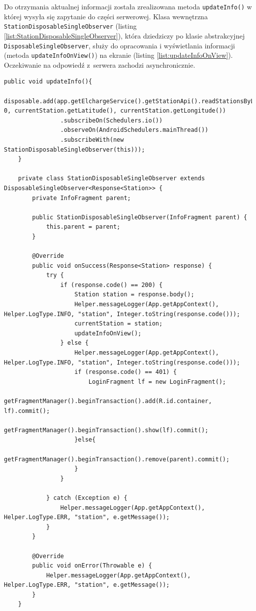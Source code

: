 Do otrzymania aktualnej informacji została zrealizowana metoda \texttt{updateInfo()} w której wysyła się zapytanie do części serwerowej.
Klasa wewnętrzna \texttt{StationDisposableSingleObserver} (listing \ref{list:StationDisposableSingleObserver}), która dziedziczy po klasie abstrakcyjnej \texttt{DisposableSingleObserver}, służy do opracowania i wyświetlania informacji (metoda \texttt{updateInfoOnView()}) na ekranie (listing \ref{list:updateInfoOnView}).
Oczekiwanie na odpowiedź z~serwera zachodzi asynchronicznie.
\begin{lstlisting}[label=list:StationDisposableSingleObserver,caption=Wczytanie danych stacji z części serwerowej,basicstyle=\tiny\ttfamily]
    public void updateInfo(){
        disposable.add(app.getElchargeService().getStationApi().readStationsByLatAndLng(0, 0, currentStation.getLatitude(), currentStation.getLongitude())
                .subscribeOn(Schedulers.io())
                .observeOn(AndroidSchedulers.mainThread())
                .subscribeWith(new StationDisposableSingleObserver(this)));
    }

    private class StationDisposableSingleObserver extends DisposableSingleObserver<Response<Station>> {
        private InfoFragment parent;

        public StationDisposableSingleObserver(InfoFragment parent) {
            this.parent = parent;
        }

        @Override
        public void onSuccess(Response<Station> response) {
            try {
                if (response.code() == 200) {
                    Station station = response.body();
                    Helper.messageLogger(App.getAppContext(), Helper.LogType.INFO, "station", Integer.toString(response.code()));
                    currentStation = station;
                    updateInfoOnView();
                } else {
                    Helper.messageLogger(App.getAppContext(), Helper.LogType.INFO, "station", Integer.toString(response.code()));
                    if (response.code() == 401) {
                        LoginFragment lf = new LoginFragment();
                        getFragmentManager().beginTransaction().add(R.id.container, lf).commit();
                        getFragmentManager().beginTransaction().show(lf).commit();
                    }else{
                        getFragmentManager().beginTransaction().remove(parent).commit();
                    }
                }

            } catch (Exception e) {
                Helper.messageLogger(App.getAppContext(), Helper.LogType.ERR, "station", e.getMessage());
            }
        }

        @Override
        public void onError(Throwable e) {
            Helper.messageLogger(App.getAppContext(), Helper.LogType.ERR, "station", e.getMessage());
        }
    }
\end{lstlisting}
